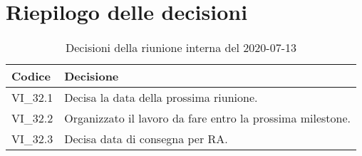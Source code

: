 \section{Riepilogo delle decisioni}
\begin{longtable}{ 
	 >{\centering}p{} >{}p{} }
	
	\caption{Decisioni della riunione interna del 2020-07-13}\\	
	
	\textbf{\color{white}Codice} & 
	\textbf{\color{white}Decisione} 
	\tabularnewline  
	\endhead
	
	VI\_32.1 & Decisa la data della prossima riunione. \\
	VI\_32.2 & Organizzato il lavoro da fare entro la prossima milestone\textit{\ped{G}}. \\
	VI\_32.3 & Decisa data di consegna per RA. \\
\end{longtable}
